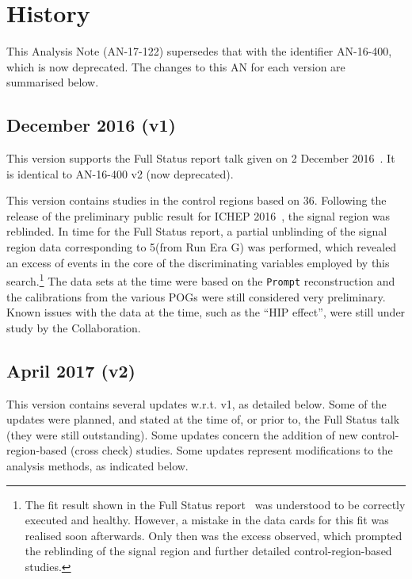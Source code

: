 
\section{History}
\label{sec:history}

This Analysis Note (AN-17-122) supersedes that with the identifier
AN-16-400, which is now deprecated. The changes to this AN for each
version are summarised below.

\subsection{December 2016 (v1)}

This version supports the Full Status report talk given on
2 December 2016~\cite{fullstatus}. It is identical to
AN-16-400 v2 (now deprecated).

This version contains studies in the control regions based on
36\fbinv. Following the release of the preliminary public result for
ICHEP 2016~\cite{CMS-PAS-SUS-16-016}, the signal region was
reblinded. In time for the Full Status report, a partial unblinding of
the signal region data corresponding to 5\fbinv (from Run Era G) was
performed, which revealed an excess of events in the core of the
discriminating variables employed by this search.\footnote{The fit
  result shown in the Full Status report~\cite{fullstatus} was
  understood to be correctly executed and healthy. However, a mistake
  in the data cards for this fit was realised soon afterwards. Only
  then was the excess observed, which prompted the reblinding of the
  signal region and further detailed control-region-based studies.}
The data sets at the time were based on the \verb!Prompt!
reconstruction and the calibrations from the various POGs were still
considered very preliminary. Known issues with the data at the time,
such as the ``HIP effect'', were still under study by the
Collaboration.

\subsection{April 2017 (v2)}

This version contains several updates w.r.t. v1, as detailed
below. Some of the updates were planned, and stated at the time of, or
prior to, the Full Status talk (\ie they were still outstanding). Some
updates concern the addition of new control-region-based (cross check)
studies. Some updates represent modifications to the analysis methods,
as indicated below.
  
